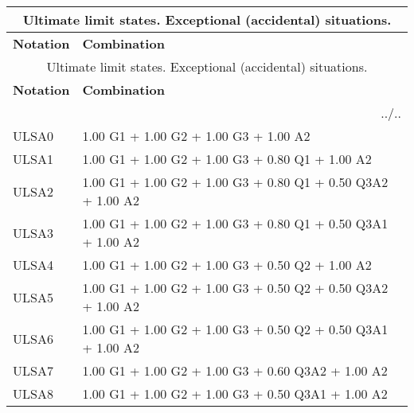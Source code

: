 \begin{center}
\begin{small}
\begin{longtable}{|l|p{10cm}|}
\hline
\multicolumn{2}{|c|}{Ultimate limit states. Exceptional (accidental) situations.}\\
\hline
\textbf{Notation} & \textbf{Combination} \\
\hline
\endfirsthead
\hline
\multicolumn{2}{|c|}{Ultimate limit states. Exceptional (accidental) situations.}\\
\hline
\textbf{Notation} & \textbf{Combination} \\
\hline
\endhead
\hline \multicolumn{2}{|r|}{{../..}} \\ \hline
\endfoot
\hline
\endlastfoot
ULSA0 & 1.00 G1 + 1.00 G2 + 1.00 G3 + 1.00 A2\\
ULSA1 & 1.00 G1 + 1.00 G2 + 1.00 G3 + 0.80 Q1 + 1.00 A2\\
ULSA2 & 1.00 G1 + 1.00 G2 + 1.00 G3 + 0.80 Q1 + 0.50 Q3A2 + 1.00 A2\\
ULSA3 & 1.00 G1 + 1.00 G2 + 1.00 G3 + 0.80 Q1 + 0.50 Q3A1 + 1.00 A2\\
ULSA4 & 1.00 G1 + 1.00 G2 + 1.00 G3 + 0.50 Q2 + 1.00 A2\\
ULSA5 & 1.00 G1 + 1.00 G2 + 1.00 G3 + 0.50 Q2 + 0.50 Q3A2 + 1.00 A2\\
ULSA6 & 1.00 G1 + 1.00 G2 + 1.00 G3 + 0.50 Q2 + 0.50 Q3A1 + 1.00 A2\\
ULSA7 & 1.00 G1 + 1.00 G2 + 1.00 G3 + 0.60 Q3A2 + 1.00 A2\\
ULSA8 & 1.00 G1 + 1.00 G2 + 1.00 G3 + 0.50 Q3A1 + 1.00 A2\\
\hline
\end{longtable}
\end{small}
\end{center}
